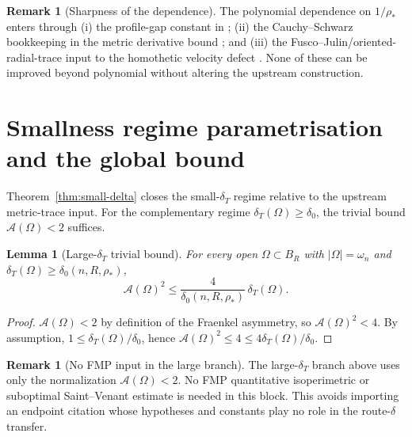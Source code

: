 \documentclass[11pt]{article}
\newtheorem{lemma}[theorem]{Lemma}
\theoremstyle{definition}
\newtheorem{remark}[theorem]{Remark}
\newcommand{\Fr}{\mathcal{A}}
\newcommand{\Om}{\Omega}
\newcommand{\rstar}{\rho_{*}}
\begin{document}
\begin{remark}[Sharpness of the dependence]
The polynomial dependence on $1/\rstar$ enters through (i) the
profile-gap constant in \cite[(5.1)]{LevelSetIdentity}; (ii) the
Cauchy--Schwarz bookkeeping in the metric derivative bound
\cite[(2.4),(4.2)]{WeightedMetricTrace}; and (iii) the
Fusco--Julin/oriented-radial-trace input to the homothetic velocity defect
\cite{WeightedMetricTrace}. None of these can be improved beyond
polynomial without altering the upstream construction.
\end{remark}

\section{Smallness regime parametrisation and the global bound}
\label{sec:smallness}

Theorem~\ref{thm:small-delta} closes the small-$\delta_T$ regime
relative to the upstream metric-trace input.
For the complementary regime $\delta_T(\Om)\ge\delta_0$, the trivial
bound $\Fr(\Om)<2$ suffices.

\begin{lemma}[Large-$\delta_T$ trivial bound]\label{lem:large-delta}
For every open $\Om\subset B_R$ with $|\Om|=\omega_n$ and
$\delta_T(\Om)\ge \delta_0(n,R,\rstar)$,
\begin{equation}\label{eq:large-delta}
\Fr(\Om)^2\le \frac{4}{\delta_0(n,R,\rstar)}\,\delta_T(\Om).
\end{equation}
\end{lemma}

\begin{proof}
$\Fr(\Om)<2$ by definition of the Fraenkel asymmetry, so
$\Fr(\Om)^2<4$. By assumption,
$1\le \delta_T(\Om)/\delta_0$, hence
$\Fr(\Om)^2\le 4\le 4\delta_T(\Om)/\delta_0$.
\end{proof}

\begin{remark}[No FMP input in the large branch]\label{rem:FMP}
The large-$\delta_T$ branch above uses only the normalization
$\Fr(\Om)<2$. No FMP quantitative isoperimetric or suboptimal
Saint--Venant estimate is needed in this block. This avoids importing
an endpoint citation whose hypotheses and constants play no role in
the route-$\delta$ transfer.
\end{remark}
\end{document}
